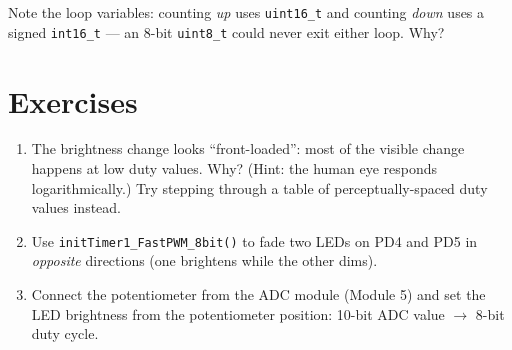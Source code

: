 \documentclass[11pt,a4paper]{article}
\begin{document}


Note the loop variables: counting \emph{up} uses \texttt{uint16\_t} and
counting \emph{down} uses a signed \texttt{int16\_t} --- an 8-bit
\texttt{uint8\_t} could never exit either loop. Why?

\section{Exercises}

\begin{enumerate}
  \item The brightness change looks ``front-loaded'': most of the visible
        change happens at low duty values. Why? (Hint: the human eye responds
        logarithmically.) Try stepping through a table of perceptually-spaced
        duty values instead.
  \item Use \texttt{initTimer1\_FastPWM\_8bit()} to fade two LEDs on PD4 and
        PD5 in \emph{opposite} directions (one brightens while the other dims).
  \item Connect the potentiometer from the ADC module (Module 5) and set the
        LED brightness from the potentiometer position: 10-bit ADC value
        $\rightarrow$ 8-bit duty cycle.
\end{enumerate}
\end{document}
